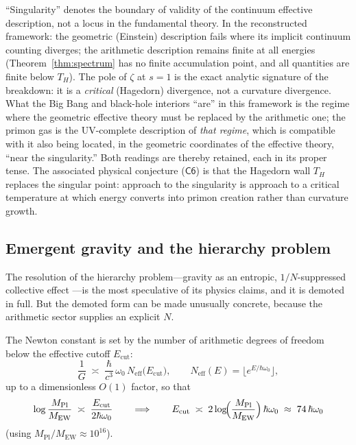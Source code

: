 \begin{remark}\label{rem:singularity}
``Singularity'' denotes the boundary of validity of the continuum effective description, not
a locus in the fundamental theory. In the reconstructed framework: the geometric (Einstein)
description fails where its implicit continuum counting diverges; the arithmetic description
remains finite at all energies (Theorem~\ref{thm:spectrum} has no finite accumulation
point, and all quantities are finite below $T_{H}$). The pole of $\zeta$ at $s=1$ is the
exact analytic signature of the breakdown: it is a \emph{critical} (Hagedorn) divergence,
not a curvature divergence. What the Big Bang and black-hole interiors ``are'' in this
framework is the regime where the geometric effective theory must be replaced by the
arithmetic one; the primon gas is the UV-complete description of \emph{that regime}, which is
compatible with it also being located, in the geometric coordinates of the effective theory,
``near the singularity.'' Both readings are thereby retained, each in its
proper tense. The associated physical conjecture ($\mathsf{C6}$) is that the Hagedorn wall
$T_{H}$ replaces the singular point: approach to the singularity is approach to a critical
temperature at which energy converts into primon creation rather than curvature growth.
\end{remark}

\subsection{Emergent gravity and the hierarchy problem}

The resolution of the hierarchy problem---gravity as an entropic, $1/N$-suppressed
collective effect \cite{jacobson1995,verlinde2011,thooft1974}---is the most speculative of
its physics claims, and it is demoted in full. But the demoted form can be made
unusually concrete, because the arithmetic sector supplies an explicit $N$.

\begin{conjecture}\label{conj:hierarchy}
The Newton constant is set by the number of arithmetic degrees of freedom below the
effective cutoff $E_{\mathrm{cut}}$:
\begin{equation}
\frac{1}{G}\;\asymp\;\frac{\hbar}{c^{3}}\,\omega_{0}\,
N_{\mathrm{eff}}\bigl(E_{\mathrm{cut}}\bigr),
\qquad
N_{\mathrm{eff}}(E)=\lfloor e^{E/\hbar\omega_{0}}\rfloor,
\end{equation}
up to a dimensionless $O(1)$ factor, so that
\begin{equation}\label{eq:hierlog}
\log\frac{M_{\mathrm{Pl}}}{M_{\mathrm{EW}}}\;\asymp\;
\frac{E_{\mathrm{cut}}}{2\hbar\omega_{0}}
\qquad\Longrightarrow\qquad
E_{\mathrm{cut}}\;\asymp\;2\log\!\Bigl(\frac{M_{\mathrm{Pl}}}{M_{\mathrm{EW}}}\Bigr)\,\hbar\omega_{0}
\;\approx\;74\,\hbar\omega_{0}
\end{equation}
(using $M_{\mathrm{Pl}}/M_{\mathrm{EW}}\approx10^{16}$).
\end{conjecture}

